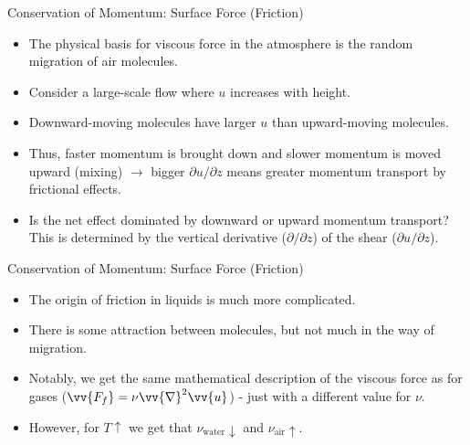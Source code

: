 \begin{frame}{Conservation of Momentum: Surface Force (Friction)}
\begin{itemize}
	\item The physical basis for viscous force in the atmosphere is the random migration of air molecules.
	\item Consider a large-scale flow where $u$ increases with height.
	\item Downward-moving molecules have larger $u$ than upward-moving molecules.
	\item Thus, faster momentum is brought down and slower momentum is moved upward (mixing) $\rightarrow$ bigger $\partial u / \partial z$ means greater momentum transport by frictional effects.
	\item Is the net effect dominated by downward or upward momentum transport? This is determined by the vertical derivative ($\partial / \partial z$) of the shear ($\partial u / \partial z$).
\end{itemize}
\end{frame}
\begin{frame}{Conservation of Momentum: Surface Force (Friction)}
\begin{itemize}
	\item The origin of friction in liquids is much more complicated. 
	\item There is some attraction between molecules, but not much in the way of migration.
	\item Notably, we get the same mathematical description of the viscous force as for gases ($\vv{F_f} = \nu \vv{\nabla}^2 \vv{u}$) - just with a different value for $\nu$.
	\item However, for $T\uparrow$ we get that $\nu_{\text{water}} \downarrow$ and $\nu_{\text{air}} \uparrow$.
\end{itemize}
\end{frame}



